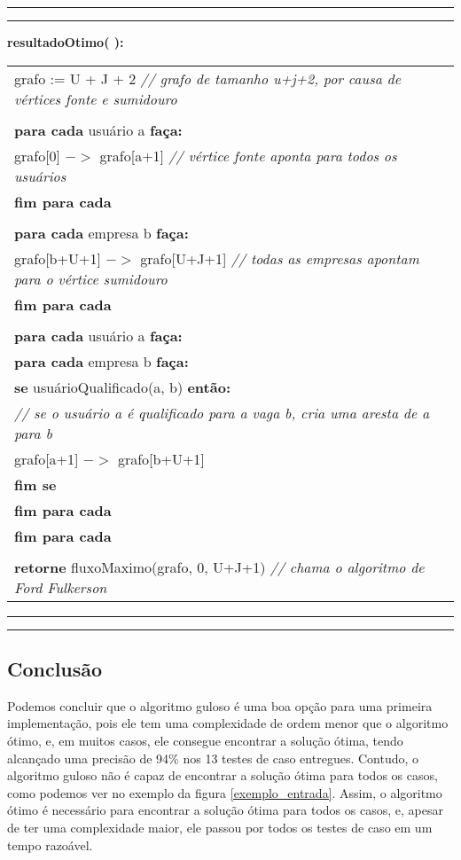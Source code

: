 \documentclass[12pt]{article}
\begin{document}
		\vspace{12pt}
		\newpage
		\hrule
		\vspace{3pt}
		\hrule
		\noindent \textbf{resultadoOtimo( ):} \\
		\noindent\begin{tabular}{l}
			grafo := U + J + 2 \footnotesize \textit{// grafo de tamanho u+j+2, por causa de vértices fonte e sumidouro} \\ \\
			\textbf{para cada} usuário a \textbf{faça:} \\
			\indent grafo[0] $->$ grafo[a+1] \footnotesize \textit{// vértice fonte aponta para todos os usuários} \\
			\textbf{fim para cada} \\ \\
			\textbf{para cada} empresa b \textbf{faça:} \\
			\indent grafo[b+U+1] $->$ grafo[U+J+1] \footnotesize \textit{// todas as empresas apontam para o vértice sumidouro} \\
			\textbf{fim para cada} \\ \\
			\textbf{para cada} usuário a \textbf{faça:} \\
			\indent \textbf{para cada} empresa b \textbf{faça:} \\
			\indent \indent \textbf{se} usuárioQualificado(a, b) \textbf{então:} \\
			\indent \indent \indent \footnotesize \textit{// se o usuário a é qualificado para a vaga b, cria uma aresta de a para b} \\
			\indent \indent \indent grafo[a+1] $->$ grafo[b+U+1] \\
			\indent \indent \textbf{fim se} \\
			\indent \textbf{fim para cada} \\
			\textbf{fim para cada} \\ \\
			\textbf{retorne} fluxoMaximo(grafo, 0, U+J+1) \footnotesize \textit{// chama o algoritmo de Ford Fulkerson} \\
		\end{tabular}
		\hrule
		\vspace{3pt}
		\hrule

	\subsection{Conclusão}
		\par Podemos concluir que o algoritmo guloso é uma boa opção para uma primeira implementação, pois ele tem uma complexidade de ordem menor que o algoritmo ótimo, e, em muitos casos, ele consegue encontrar a solução ótima, tendo alcançado uma precisão de 94\% nos 13 testes de caso entregues. Contudo, o algoritmo guloso não é capaz de encontrar a solução ótima para todos os casos, como podemos ver no exemplo da figura \ref{exemplo_entrada}. Assim, o algoritmo ótimo é necessário para encontrar a solução ótima para todos os casos, e, apesar de ter uma complexidade maior, ele passou por todos os testes de caso em um tempo razoável.
\end{document}
